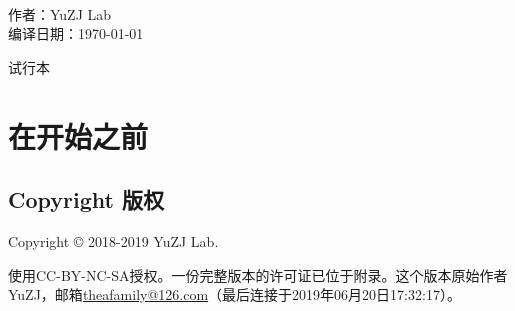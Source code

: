 \documentclass{book}
\begin{document}
\setcounter{tocdepth}{3}
\begin{titlepage}
	\vspace*{10mm}
	\begin{center}
		\\\vspace*{5mm}
		\large 作者：YuZJ Lab \\\vspace*{5mm}
		\large 编译日期：\today\normalsize
	\end{center}
\vspace*{25mm}
\end{titlepage}
\begin{center}
	\Huge 试行本 \normalsize
\end{center}
\tableofcontents
\chapter{在开始之前}
\section{Copyright 版权}
Copyright \copyright{} 2018-2019 YuZJ Lab. \par
使用CC-BY-NC-SA授权。一份完整版本的许可证已位于附录。这个版本原始作者YuZJ，邮箱\url{theafamily@126.com}（最后连接于2019年06月20日17:32:17）。
\begin{center}\large{\textbf{{\color{red}{对本文档所引起的任何后果不作担保！}}}}\normalsize\end{center}
\end{document}
